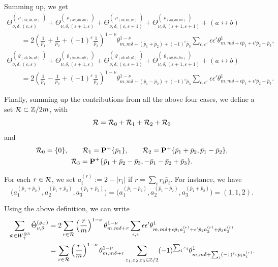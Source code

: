 \documentclass[pdftex]{sigma}
\newcommand{\ZZ}{\mathbb{Z}}
\def\bos{\varrho}
\theoremstyle{definition}
\numberwithin{equation}{section}
\begin{document}
Summing up, we get
\begin{gather*}
\Theta_{\nu,\delta,(\varepsilon,\varepsilon)}^{(\bos_{(ab,ab,ab)})} + \Theta_{\nu,\delta,(\varepsilon+1,\varepsilon)}^{(\bos_{(ba,ab,ab)})}+ \Theta_{\nu,\delta,(\varepsilon,\varepsilon+1)}^{(\bos_{(ab,ba,ab)})} +\Theta_{\nu,\delta,(\varepsilon+1,\varepsilon+1)}^{(\bos_{(ab,ab,ba)})} + (a\leftrightarrow b) \\
\qquad= 2\left(\frac{1}{p_1}+\frac{1}{p_2} +(-1)^{\varepsilon}\frac{1}{p_3}\right)^{1-\nu} \theta^{1-\nu}_{m,m\delta+(\bar p_1+\bar p_2)+(-1)^{\varepsilon}\bar p_3} \sum_{\epsilon, \epsilon'} \epsilon\epsilon' \theta^1_{m,m\delta+\epsilon \bar p_1+\epsilon '\bar p_2 -\bar p_3},\\
\Theta_{\nu,\delta,(\varepsilon,\varepsilon)}^{(\bos_{(ab,ba,ab)})} + \Theta_{\nu,\delta,(\varepsilon+1,\varepsilon)}^{(\bos_{(ba,ba,ab)})}+ \Theta_{\nu,\delta,(\varepsilon,\varepsilon+1)}^{(\bos_{(ab,ab,ab)})} +\Theta_{\nu,\delta,(\varepsilon+1,\varepsilon+1)}^{(\bos_{(ab,ba,ba)})} + (a\leftrightarrow b) \\
\qquad= 2
 \left(\frac{1}{p_1}-\frac{1}{p_2} +(-1)^{\varepsilon}\frac{1}{p_3}\right)^{1-\nu}
 \theta^{1-\nu}_{m,m\delta+(\bar p_1-\bar p_2)+(-1)^{\varepsilon}\bar p_3} \sum_{\epsilon, \epsilon'} \epsilon\epsilon' \theta^1_{m,m\delta+\epsilon \bar p_1+\epsilon' \bar p_2 -\bar p_3} .
\end{gather*}

Finally, summing up the contributions from all the above four cases, we define a set ${\cal R} \subset \ZZ/2m$, with
\[
{\cal R} = {\cal R}_0+{\cal R}_1+{\cal R}_2+{\cal R}_3
\]
and
\begin{gather*}
 {\cal R}_0 = \{0\},\qquad
 {\cal R}_1 = {\bf P}^+ \{\bar p_1\}, \qquad
 {\cal R}_2 = {\bf P}^+ \{\bar p_1+\bar p_2, \bar p_1-\bar p_2\},\\
 {\cal R}_3 = {\bf P}^+ \{\bar p_1+\bar p_2-\bar p_3, -\bar p_1-\bar p_2+\bar p_3\}.
\end{gather*}

For each $r\in {\cal R}$, we set $a_i^{(r)}:= 2-|r_i|$ if $r=\sum_i r_i \bar p_i$. For instance, we have \[\bigl(a_1^{(\bar p_1+\bar p_2)}, a_2^{(\bar p_1+\bar p_2)},a_3^{(\bar p_1+\bar p_2)}\bigr) =\bigl(a_1^{(\bar p_1-\bar p_2)}, a_2^{(\bar p_1-\bar p_2)},a_3^{(\bar p_1+\bar p_2)}\bigr) = (1,1,2).\]

Using the above definition, we can write
\begin{align*}
 \sum\limits_{\hat{w}\in W_+^{\otimes 3}} {\tilde \Theta_{\nu,\delta}}^{(\bos_{\hat{w}})} &= 2\sum_{r\in {\cal R}} \left(\frac{r}{m}\right)^{1-\nu} \theta^{1-\nu}_{m,m\delta+r} \sum_{\epsilon, \epsilon} \epsilon\epsilon' \theta^1_{m,m\delta+\epsilon \bar p_1 a_1^{(r)}
 +\epsilon' \bar p_2 a_2^{(r)} + \bar p_3 a_3^{(r)}} \\
 &=\sum_{r\in {\cal R}} \left(\frac{r}{m}\right)^{1-\nu} \theta^{1-\nu}_{m,m\delta+r} \sum_{\varepsilon_1,\varepsilon_2,\varepsilon_3\in \ZZ/2} (-1)^{\sum_i \varepsilon_i} \theta^1_{m,m\delta+\sum_i (-1)^{ \varepsilon_i}\bar p_i a_i^{(r)}
 } .
\end{align*}
\end{document}

